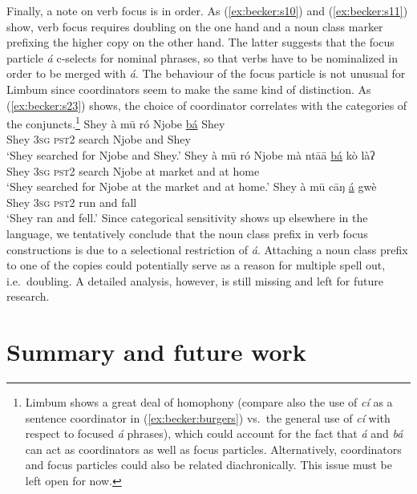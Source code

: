 \documentclass[output=paper,
modfonts
]{langscibook}
\begin{document}
Finally, a note on verb focus is in order. As (\ref{ex:becker:s10}) and (\ref{ex:becker:s11}) show, verb focus requires doubling on the one hand and a noun class marker prefixing the higher copy on the other hand. The latter suggests that the focus particle {\em \'a} c-selects for nominal phrases, so that verbs have to be nominalized in order to be merged with {\em \'a}. The behaviour of the focus particle is not unusual for Limbum since coordinators seem to make the same kind of distinction. As (\ref{ex:becker:s23}) shows, the choice of coordinator correlates with the categories of the conjuncts.\footnote{Limbum shows a great deal of homophony (compare also the use of {\em c\'i} as a sentence coordinator in (\ref{ex:becker:burgers}) vs.\ the general use of {\em c\'i} with respect to focused {\em \'a} phrases), which could account for the fact that {\em \'a} and {\em b\'a} can act as coordinators as well as focus particles. Alternatively, coordinators and focus particles could also be related diachronically. This issue must be left open for now.}
\ea \label{ex:becker:s23}
\ea
\gll Shey \`a m\=u r\'o Njobe \underline{b\'a} Shey \\ 
Shey \textsc{3sg} \textsc{pst2} search Njobe and Shey \\ 
\glt `Shey searched for Njobe and Shey.'
\ex
\gll Shey \`a m\=u r\'o Njobe m\`a nt\=a\=a \underline{b\'a} k\`o l\`aʔ \\ 
Shey \textsc{3sg} \textsc{pst2} search Njobe at market and at home \\ 
\glt `Shey searched for Njobe at the market and at home.'
\ex
\gll Shey \`a m\=u c\=aŋ \underline{\'a} gw\`e \\ 
Shey \textsc{3sg} \textsc{pst2} run and fall \\ 
\glt `Shey ran and fell.'
\z \z 
Since categorical sensitivity shows up elsewhere in the language, we tentatively conclude that the noun class prefix in verb focus constructions is due to a selectional restriction of {\em \'a}. Attaching a noun class prefix to one of the copies could potentially serve as a reason for multiple spell out, i.e.\ doubling. A detailed analysis, however, is still missing and left for future research.\largerpage[-2]

\section{Summary and future work}\largerpage[-2]
\end{document}
